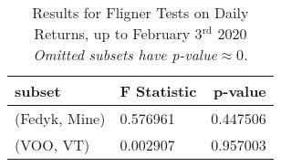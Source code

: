 \begin{appendices}
\begin{table}[ht]
\centering
\caption{Results for Fligner Tests on Daily Returns, up to February 3$^\text{rd}$ 2020
\newline \footnotesize{\textit{Omitted subsets have p-value$\approx0$}.}}
    \begin{tabular}{l|ll}
    \toprule
    \textbf{subset}        & \multicolumn{1}{r}{\textbf{F Statistic}} & \multicolumn{1}{r}{\textbf{p-value}} \\ \midrule
    \midrule
    (Fedyk, Mine)                       & 0.576961                       & 0.447506                       \\
    (VOO, VT)                           & 0.002907                       & 0.957003                      
    \end{tabular}
\label{tab:fligner_before}
\end{table}


\end{appendices}
